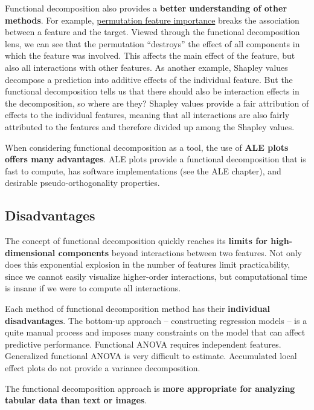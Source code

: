 \documentclass[
  11pt,
]{scrbook}
\begin{document}
Functional decomposition also provides a \textbf{better understanding of other methods}.
For example, \protect\hyperlink{feature-importance}{permutation feature importance} breaks the association between a feature and the target.
Viewed through the functional decomposition lens, we can see that the permutation ``destroys'' the effect of all components in which the feature was involved.
This affects the main effect of the feature, but also all interactions with other features.
As another example, Shapley values decompose a prediction into additive effects of the individual feature.
But the functional decomposition tells us that there should also be interaction effects in the decomposition, so where are they?
Shapley values provide a fair attribution of effects to the individual features, meaning that all interactions are also fairly attributed to the features and therefore divided up among the Shapley values.

When considering functional decomposition as a tool, the use of \textbf{ALE plots offers many advantages}.
ALE plots provide a functional decomposition that is fast to compute, has software implementations (see the ALE chapter), and desirable pseudo-orthogonality properties.

\hypertarget{disadvantages-8}{%
\subsection{Disadvantages}\label{disadvantages-8}}

The concept of functional decomposition quickly reaches its \textbf{limits for high-dimensional components} beyond interactions between two features.
Not only does this exponential explosion in the number of features limit practicability, since we cannot easily visualize higher-order interactions, but computational time is insane if we were to compute all interactions.

Each method of functional decomposition method has their \textbf{individual disadvantages}.
The bottom-up approach -- constructing regression models -- is a quite manual process and imposes many constraints on the model that can affect predictive performance.
Functional ANOVA requires independent features.
Generalized functional ANOVA is very difficult to estimate.
Accumulated local effect plots do not provide a variance decomposition.

The functional decomposition approach is \textbf{more appropriate for analyzing tabular data than text or images}.
\end{document}
